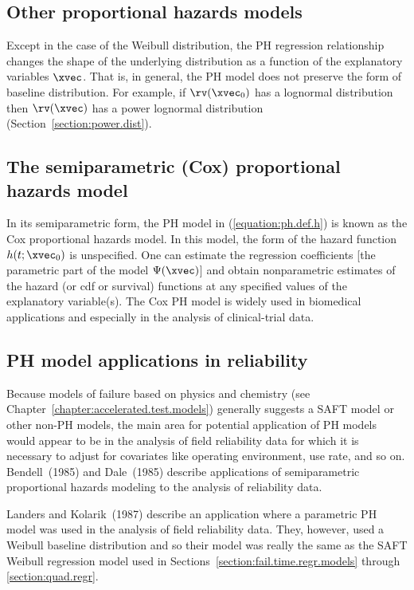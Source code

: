 \subsection{Other proportional hazards models}

Except in the case of the Weibull distribution, the PH regression
relationship changes the shape of the underlying distribution as a
function of the explanatory variables $\xvec$.  That is, in general,
the PH model does not preserve the form of baseline distribution.
For example, if $\rv(\xvec_{0})$ has a lognormal distribution then
$\rv(\xvec)$ has a power lognormal distribution
(Section~\ref{section:power.dist}).

\subsection{The semiparametric (Cox) proportional hazards model}
In its semiparametric form, the PH model in
(\ref{equation:ph.def.h}) is known as the Cox
proportional hazards model. In this model, the form of the hazard
function $h(t ; \xvec_{0})$ is unspecified. One can estimate the regression
coefficients [the parametric part of the model $\Psi(\xvec)$] and obtain
nonparametric estimates of the hazard (or cdf or survival) functions
at any specified values of the explanatory variable(s).  The Cox PH
model is widely used in biomedical applications and especially in
the analysis of clinical-trial data.


\subsection{PH model applications in reliability}
Because models of failure based on physics and chemistry (see
Chapter~\ref{chapter:accelerated.test.models}) generally suggests
a SAFT model or other non-PH models, the main area for potential
application of PH models would appear to be in the analysis of field
reliability data for which it is necessary to adjust for covariates
like operating environment, use rate, and so on.  Bendell~(1985) and
Dale~(1985) describe applications of semiparametric proportional
hazards modeling to the analysis of reliability data.

Landers and Kolarik~(1987) describe an application where a
parametric PH model was used in the analysis of field reliability
data. They, however, used a Weibull baseline distribution and so
their model was really the same as the SAFT Weibull regression model
used in Sections~\ref{section:fail.time.regr.models} through
\ref{section:quad.regr}.

